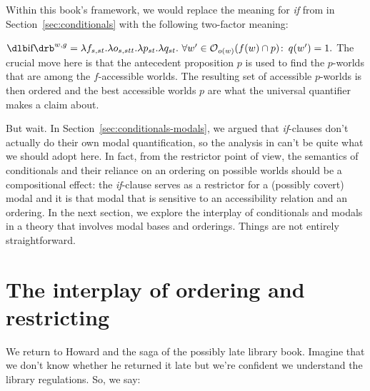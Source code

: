 Within this book's framework, we would replace the meaning for \emph{if} from
 in Section~\ref{sec:conditionals} with the
following two-factor meaning:

\ex
$\svt{if}^{w,g} = \lambda f_{s,st}.\lambda o_{s,stt}.\lambda p_{st}.\lambda
q_{st}.\ \forall w'\in \opt_{o(w)}(f(w) \cap p)\co q(w')=1.$
\xe
%
The crucial move here is that the antecedent proposition $p$ is used to find the
$p$-worlds that are among the $f$-accessible worlds. The resulting set of
accessible $p$-worlds is then ordered and the best accessible worlds $p$ are
what the universal quantifier makes a claim about.

But wait. In Section~\ref{sec:conditionals-modals}, we argued that
\emph{if}-clauses don't actually do their own modal quantification, so the
analysis in \Last can't be quite what we should adopt here. In fact, from the
restrictor point of view, the semantics of conditionals and their reliance on an
ordering on possible worlds should be a compositional effect: the
\emph{if}-clause serves as a restrictor for a (possibly covert) modal and it is
that modal that is sensitive to an accessibility relation and an ordering. In
the next section, we explore the interplay of conditionals and modals in a
theory that involves modal bases and orderings. Things are not entirely
straightforward. 

\section{The interplay of ordering and restricting}
\label{sec:interplay}

We return to Howard and the saga of the possibly late library book. Imagine that
we don't know whether he returned it late but we're confident we understand the
library regulations. So, we say:

